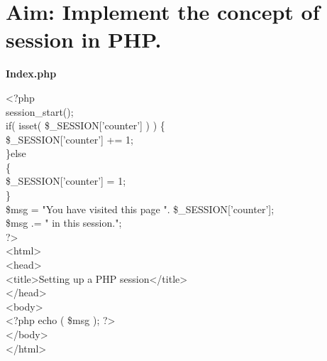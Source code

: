 \section*{\fontsize{16}{14}\selectfont Aim: Implement the concept of session in PHP.}
\textbf{Index.php}

<?php\\
session\_start();\\
if( isset( \$\_SESSION['counter'] ) ) \{\\
\$\_SESSION['counter'] += 1;\\
\}else\\
 \{\\
\$\_SESSION['counter'] = 1;\\
\}\\
\$msg = "You have visited this page ". \$\_SESSION['counter']; \\
\$msg .= " in this session."; \\
?>\\
<html>\\
<head>\\
<title>Setting up a PHP session</title>\\
</head>\\
<body>\\
<?php echo ( \$msg ); ?>\\
</body>\\
</html>\\
